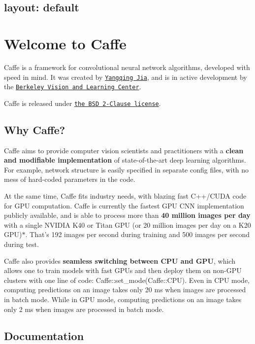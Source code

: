 

 \subsection*{layout\+: default }

\section*{Welcome to Caffe}

Caffe is a framework for convolutional neural network algorithms, developed with speed in mind. It was created by \href{http://daggerfs.com}{\tt Yangqing Jia}, and is in active development by the \href{http://bvlc.eecs.berkeley.edu}{\tt Berkeley Vision and Learning Center}.

Caffe is released under \href{https://github.com/BVLC/caffe/blob/master/LICENSE}{\tt the B\+S\+D 2-\/\+Clause license}.

\subsection*{Why Caffe?}

Caffe aims to provide computer vision scientists and practitioners with a {\bfseries clean and modifiable implementation} of state-\/of-\/the-\/art deep learning algorithms. For example, network structure is easily specified in separate config files, with no mess of hard-\/coded parameters in the code.

At the same time, Caffe fits industry needs, with blazing fast C++/\+C\+U\+D\+A code for G\+P\+U computation. Caffe is currently the fastest G\+P\+U C\+N\+N implementation publicly available, and is able to process more than {\bfseries 40 million images per day} with a single N\+V\+I\+D\+I\+A K40 or Titan G\+P\+U (or 20 million images per day on a K20 G\+P\+U)$\ast$. That's 192 images per second during training and 500 images per second during test.

Caffe also provides {\bfseries seamless switching between C\+P\+U and G\+P\+U}, which allows one to train models with fast G\+P\+Us and then deploy them on non-\/\+G\+P\+U clusters with one line of code\+: {\ttfamily Caffe\+::set\+\_\+mode(\+Caffe\+::\+C\+P\+U)}. Even in C\+P\+U mode, computing predictions on an image takes only 20 ms when images are processed in batch mode. While in G\+P\+U mode, computing predictions on an image takes only 2 ms when images are processed in batch mode.

\subsection*{Documentation}


